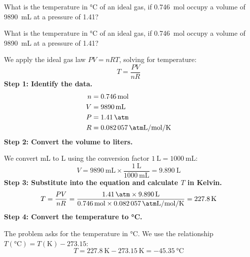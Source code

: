 \begin{exercise}
    What is the temperature in \unit{\degreeCelsius} of an ideal gas, if \qty{0.746}{\mol} occupy a volume of \qty{9890}{\mL} at a pressure of \qty{1.41}{\atmosphere}?
    \begin{solu}
        What is the temperature in \unit{\degreeCelsius} of an ideal gas, if \qty{0.746}{\mol} occupy a volume of \qty{9890}{\mL} at a pressure of \qty{1.41}{\atmosphere}?

        We apply the ideal gas law $PV = nRT$, solving for temperature:
        \begin{equation*}
            T = \frac{PV}{nR}
        \end{equation*}
        \textbf{Step 1: Identify the data.}
        \begin{align*}
            n &= \qty{0.746}{\mol} \\
            V &= \qty{9890}{\mL} \\
            P &= \qty{1.41}{\atm} \\
            R &= \qty{0.082057}{\atm\liter\per\mol\per\kelvin}
        \end{align*}
        \textbf{Step 2: Convert the volume to liters.}

        We convert mL to L using the conversion factor $\qty{1}{\liter} = \qty{1000}{\mL}$:
        \begin{equation*}
            V = \qty{9890}{\mL} \times \frac{\qty{1}{\liter}}{\qty{1000}{\mL}} = \qty{9.890}{\liter}
        \end{equation*}
        \textbf{Step 3: Substitute into the equation and calculate $T$ in Kelvin.}
        \begin{equation*}
            T = \frac{PV}{nR} = \frac{\qty{1.41}{\atm} \times \qty{9.890}{\liter}}{\qty{0.746}{\mol} \times \qty{0.082057}{\atm\liter\per\mol\per\kelvin}} = \qty{227.8}{\kelvin}
        \end{equation*}
        \textbf{Step 4: Convert the temperature to \unit{\degreeCelsius}.}

        The problem asks for the temperature in \unit{\degreeCelsius}. We use the relationship $T(\unit{\degreeCelsius}) = T(\unit{\kelvin}) - 273.15$:
        \begin{equation*}
            T = \qty{227.8}{\kelvin} - \qty{273.15}{\kelvin} = \boxed{\qty{-45.35}{\degreeCelsius}}
        \end{equation*}
    \end{solu}
\end{exercise}
